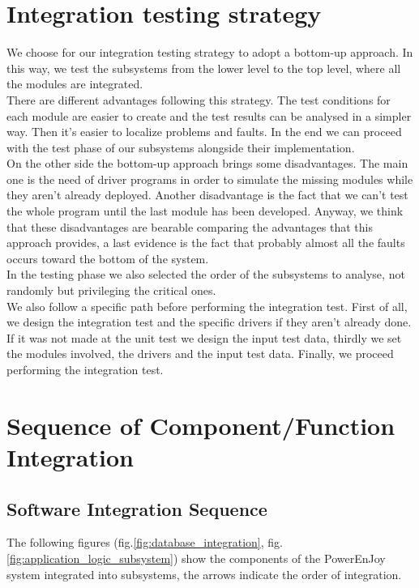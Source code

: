 \section{Integration testing strategy}
We choose for our integration testing strategy to adopt a bottom-up approach. In this way, we test the subsystems from the lower level to the top level, where all the modules are integrated. 
\\There are different advantages following this strategy. The test conditions for each module are easier to create and the test results can be analysed in a simpler way. Then it's easier to localize problems and faults. In the end we can proceed with the test phase of our subsystems alongside their implementation.
\\On the other side the bottom-up approach brings some disadvantages. The main one is the need of driver programs in order to simulate the missing modules while they aren't already deployed. Another disadvantage is the fact that we can't test the whole program until the last module has been developed. Anyway, we think that these disadvantages are bearable comparing the advantages that this approach provides, a last evidence is the fact that probably almost all the faults occurs toward the bottom of the system.
\\In the testing phase we also selected the order of the subsystems to analyse, not randomly but privileging the critical ones.
\\ We also follow a specific path before performing the integration test. First of all, we design the integration test and the specific drivers if they aren't already done. If it was not made at the unit test we design the input test data, thirdly we set the modules involved, the drivers and the input test data. Finally, we proceed performing the integration test.

\newpage
\section{Sequence of Component/Function Integration}

	\subsection{Software Integration Sequence}
	The following figures (fig.\ref{fig:database_integration}, fig.\ref{fig:application_logic_subsystem}) show the components of the PowerEnJoy system integrated into subsystems, the arrows indicate the order of integration.

